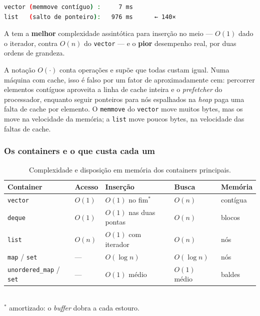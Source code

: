 \begin{lstlisting}[style=bt, language=bash,
    caption={Saída de \texttt{src/stl/}: 20\,000 inserções mantendo a ordem.}]
vector (memmove contíguo) :     7 ms
list   (salto de ponteiro):   976 ms      ← 140×
\end{lstlisting}

A  tem a \textbf{melhor} complexidade assintótica para
inserção no meio --- $O(1)$ dado o iterador, contra $O(n)$ do \texttt{vector} ---
e o \textbf{pior} desempenho real, por duas ordens de grandeza.

\begin{porque}
A notação $O(\cdot)$ conta operações e supõe que todas custam igual. Numa
máquina com cache, isso é falso por um fator de aproximadamente cem: percorrer
elementos contíguos aproveita a linha de cache inteira e o \emph{prefetcher} do
processador, enquanto seguir ponteiros para nós espalhados na \emph{heap} paga
uma falta de cache por elemento. O \texttt{memmove} do \texttt{vector} move
muitos bytes, mas os move na velocidade da memória; a \texttt{list} move poucos
bytes, na velocidade das faltas de cache.
\end{porque}

\subsubsection{Os containers e o que custa cada um}

\begin{table}[htbp]
\centering
\caption{Complexidade e disposição em memória dos containers principais.}
\label{tab:containers}
\footnotesize
\begin{tabular}{@{}lllll@{}}
\toprule
\textbf{Container} & \textbf{Acesso} & \textbf{Inserção} & \textbf{Busca} & \textbf{Memória} \\
\midrule
\texttt{vector}                        & $O(1)$ & $O(1)$ no fim$^*$ & $O(n)$ & contígua \\
\texttt{deque}                         & $O(1)$ & $O(1)$ nas duas pontas & $O(n)$ & blocos \\
\texttt{list}                          & $O(n)$ & $O(1)$ com iterador & $O(n)$ & nós \\
\texttt{map} / \texttt{set}            & ---    & $O(\log n)$ & $O(\log n)$ & nós \\
\texttt{unordered\_map} / \texttt{set} & ---    & $O(1)$ médio & $O(1)$ médio & baldes \\
\bottomrule
\end{tabular}\\[2pt]
\footnotesize $^*$ amortizado: o \emph{buffer} dobra a cada estouro.
\end{table}

